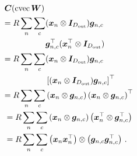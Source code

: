 \begin{align*}
  &{\bm{C}}(\operatorname{cvec} {\bm{W}})
  \\
  &\begin{aligned}
    = R \sum_n \sum_c &({\bm{x}}_n \otimes {\bm{I}}_{D_{\text{out}}}) {\bm{g}}_{n,c} \\
                      & {\bm{g}}_{n,c}^{\top} ({\bm{x}}_n^{\top} \otimes {\bm{I}}_{D_{\text{out}}})
  \end{aligned}\\
  &\begin{aligned}
    = R \sum_n \sum_c &({\bm{x}}_n \otimes {\bm{I}}_{D_{\text{out}}}) {\bm{g}}_{n,c} \\
                      &\left[({\bm{x}}_n \otimes {\bm{I}}_{D_{\text{out}}}) {\bm{g}}_{n,c} \right]^{\top}
  \end{aligned}\\
  &\begin{aligned}
    = R \sum_n \sum_c &\left( {\bm{x}}_n \otimes {\bm{g}}_{n,c} \right)\left( {\bm{x}}_n \otimes {\bm{g}}_{n,c} \right)^{\top}
  \end{aligned}\\
  &= R \sum_n \sum_c \left( {\bm{x}}_n \otimes {\bm{g}}_{n,c} \right)
    \left( {\bm{x}}_n^{\top} \otimes {\bm{g}}_{n,c}^{\top} \right) \\
  &= R \sum_n \sum_c \left({\bm{x}}_n {\bm{x}}_n^{\top}\right) \otimes \left({\bm{g}}_{n,c} {\bm{g}}_{n,c}^{\top}\right)\,.
\end{align*}


